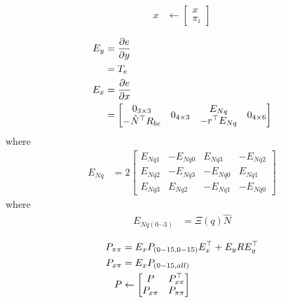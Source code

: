 \documentclass[]{article}
\begin{document}
{\begin{align}
	x &\leftarrow
	\left[
	\begin{matrix}
		x \\
		\pi_i
	\end{matrix}
	\right]
\end{align}

\begin{align}
	E_y &= \frac{\partial e}{\partial y} \notag \\
		&= T_e \\
	E_x &= \frac{\partial e}{\partial x} \notag \\
		&=
	\left[
	\begin{matrix}
		\begin{matrix}
			0_{3 \times 3} \\
			-\hat{N}^\top R_{be}
		\end{matrix}
		&
		0_{4 \times 3}
		&
		\begin{matrix}
			E_{Nq} \\
			-r^\top E_{Nq}
		\end{matrix}
		&
		0_{4 \times 6}
	\end{matrix}
	\right]
\end{align}
where
\begin{align}
	E_{Nq} 	&= 2
	\left[
	\begin{matrix}
		E_{Nq1} 	& -E_{Nq0} 	& E_{Nq3} 	& -E_{Nq2} \\
		E_{Nq2} 	& -E_{Nq3} 	& -E_{Nq0} 	& E_{Nq1} \\
		E_{Nq3} 	& E_{Nq2} 	& -E_{Nq1} 	& -E_{Nq0}
	\end{matrix}
	\right]
\end{align}
where
\begin{align}
	E_{Nq(0\cdots3)} &= \Xi(q) \hat{N}
\end{align}

\begin{align}
	P_{\pi \pi} &= E_x P_{(0-15,0-15)} E_x^\top + E_y R E_y^\top \notag \\
	P_{x \pi} 	&= E_x P_{(0-15,all)} \notag \\
	P &\leftarrow
	\left[
	\begin{matrix}
		P 			& P_{x \pi}^\top \\
		P_{x \pi}	& P_{\pi \pi}
	\end{matrix}
	\right]
\end{align}


}
\end{document}
